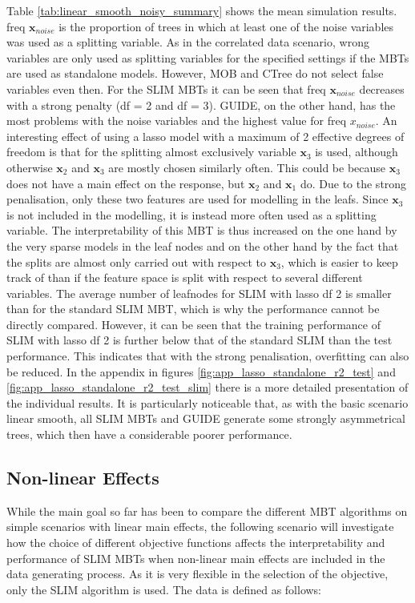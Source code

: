 Table \ref{tab:linear_smooth_noisy_summary} shows the mean simulation results. freq $ \textbf{x}_{noise}$ is the proportion of trees in which at least one of the noise variables was used as a splitting variable. 
As in the correlated data scenario, wrong variables are only used as splitting variables for the specified settings if the MBTs are used as standalone models. However, MOB and CTree do not select false variables even then. For the SLIM MBTs it can be seen that freq $\textbf{x}_{noise}$ decreases with a strong penalty (df = 2 and df = 3). GUIDE, on the other hand, has the most problems with the noise variables and the highest value for freq $x_{noise}$.
An interesting effect of using a lasso model with a maximum of 2 effective degrees of freedom is that for the splitting almost exclusively variable $\textbf{x}_3$ is used, although otherwise $\textbf{x}_2$ and $\textbf{x}_3$ are mostly chosen similarly often. This could be because $\textbf{x}_3$ does not have a main effect on the response, but $\textbf{x}_2$ and $\textbf{x}_1$ do.  Due to the strong penalisation, only these two features are used for modelling in the leafs. Since $\textbf{x}_3$ is not included in the modelling, it is instead more often used as a splitting variable.
The interpretability of this MBT is thus increased on the one hand by the very sparse models in the leaf nodes and on the other hand by the fact that the splits are almost only carried out with respect to $\textbf{x}_3$, which is easier to keep track of than if the feature space is split with respect to several different variables.
The average number of leafnodes for SLIM with lasso df 2 is smaller than for the standard SLIM MBT, which is why the performance cannot be directly compared. However, it can be seen that the training performance of SLIM with lasso df 2 is further below that of the standard SLIM than the test performance. This indicates that with the strong penalisation, overfitting can also be reduced.
In the appendix in figures \ref{fig:app_lasso_standalone_r2_test} and \ref{fig:app_lasso_standalone_r2_test_slim} there is a more detailed presentation of the individual results. It is particularly noticeable that, as with the basic scenario linear smooth, all SLIM MBTs and GUIDE generate some strongly asymmetrical trees, which then have a considerable poorer performance.




\subsection{Non-linear Effects}
While the main goal so far has been to compare the different MBT algorithms on simple scenarios with linear main effects, the following scenario will investigate how the choice of different objective functions affects the interpretability and performance of SLIM MBTs when non-linear main effects are included in the data generating process. 
As it is very flexible in the selection of the objective, only the SLIM algorithm is used. The data is defined as follows:

